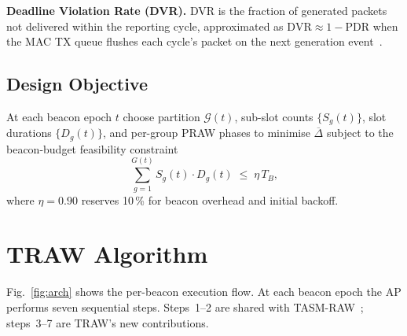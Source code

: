 \documentclass[journal]{IEEEtran}
\begin{document}
\textbf{Deadline Violation Rate (DVR).}
DVR is the fraction of generated packets not delivered within the
reporting cycle, approximated as $\mathrm{DVR}\!\approx\!1\!-\!\mathrm{PDR}$
when the MAC TX queue flushes each cycle's packet on the next
generation event~\cite{Sisinni2018}.

\subsection{Design Objective}

At each beacon epoch $t$ choose partition $\mathcal{G}(t)$, sub-slot
counts $\{S_g(t)\}$, slot durations $\{D_g(t)\}$, and per-group PRAW
phases to minimise $\overline{\Delta}$ subject to the beacon-budget
feasibility constraint
\begin{equation}
  \sum_{g=1}^{G(t)} S_g(t)\cdot D_g(t) \;\leq\; \eta\,T_B,
  \label{eq:feasibility}
\end{equation}
where $\eta\!=\!0.90$ reserves 10\,\% for beacon overhead and initial
backoff.

\section{TRAW Algorithm}
\label{sec:design}

Fig.~\ref{fig:arch} shows the per-beacon execution flow.
At each beacon epoch the AP performs seven sequential steps.
Steps~1--2 are shared with TASM-RAW~\cite{kalita2025b}; steps~3--7 are
TRAW's new contributions.
\end{document}
